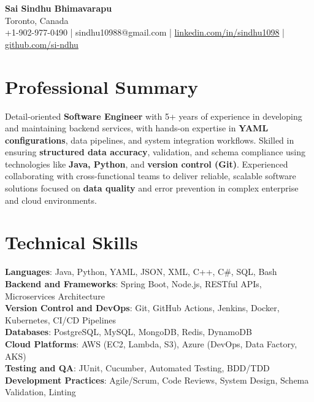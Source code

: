 \documentclass[letterpaper,11pt]{article}
\begin{document}
\begin{center}
  {\Large \textbf{Sai Sindhu Bhimavarapu}} \\
  Toronto, Canada \\
  +1-902-977-0490 \enspace | \enspace sindhu10988@gmail.com \enspace | \enspace \href{https://www.linkedin.com/in/sindhu1098/}{linkedin.com/in/sindhu1098} \enspace | \enspace \href{https://github.com/si-ndhu}{github.com/si-ndhu}
\end{center}

\section{Professional Summary}
  \begin{itemize}[leftmargin=0.15in, label={}]
    \small{\item{
     Detail-oriented \textbf{Software Engineer} with 5+ years of experience in developing and maintaining backend services, with hands-on expertise in \textbf{YAML configurations}, data pipelines, and system integration workflows. Skilled in ensuring \textbf{structured data accuracy}, validation, and schema compliance using technologies like \textbf{Java, Python}, and \textbf{version control (Git)}. Experienced collaborating with cross-functional teams to deliver reliable, scalable software solutions focused on \textbf{data quality} and error prevention in complex enterprise and cloud environments.
    }}
  \end{itemize}
\vspace{-16pt}

\section{Technical Skills}
 \begin{itemize}[leftmargin=0.15in, label={}]
    \small{\item{
     \textbf{Languages}: Java, Python, YAML, JSON, XML, C++, C\#, SQL, Bash \\
     \textbf{Backend and Frameworks}: Spring Boot, Node.js, RESTful APIs, Microservices Architecture \\
     \textbf{Version Control and DevOps}: Git, GitHub Actions, Jenkins, Docker, Kubernetes, CI/CD Pipelines \\
     \textbf{Databases}: PostgreSQL, MySQL, MongoDB, Redis, DynamoDB \\
     \textbf{Cloud Platforms}: AWS (EC2, Lambda, S3), Azure (DevOps, Data Factory, AKS) \\
     \textbf{Testing and QA}: JUnit, Cucumber, Automated Testing, BDD/TDD \\
     \textbf{Development Practices}: Agile/Scrum, Code Reviews, System Design, Schema Validation, Linting
    }}
 \end{itemize}
\vspace{-16pt}
\end{document}
